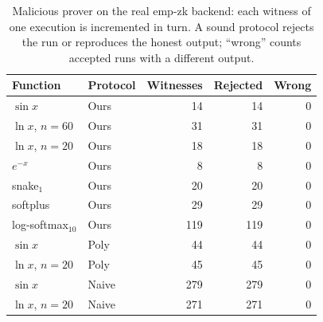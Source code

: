 \begin{table}[t]\centering\small
\caption{Malicious prover on the real emp-zk backend: each witness of one execution is incremented in turn. A sound protocol rejects the run or reproduces the honest output; ``wrong'' counts accepted runs with a different output.}
\label{tab:sound}
\setlength{\tabcolsep}{4pt}
\begin{tabular}{llrrr}\toprule
Function & Protocol & Witnesses & Rejected & Wrong\\\midrule
$\sin x$ & \textsf{Ours} & 14 & 14 & 0\\
$\ln x$, $n{=}60$ & \textsf{Ours} & 31 & 31 & 0\\
$\ln x$, $n{=}20$ & \textsf{Ours} & 18 & 18 & 0\\
$e^{-x}$ & \textsf{Ours} & 8 & 8 & 0\\
snake$_1$ & \textsf{Ours} & 20 & 20 & 0\\
softplus & \textsf{Ours} & 29 & 29 & 0\\
log-softmax$_{10}$ & \textsf{Ours} & 119 & 119 & 0\\
$\sin x$ & \textsf{Poly} & 44 & 44 & 0\\
$\ln x$, $n{=}20$ & \textsf{Poly} & 45 & 45 & 0\\
$\sin x$ & \textsf{Naive} & 279 & 279 & 0\\
$\ln x$, $n{=}20$ & \textsf{Naive} & 271 & 271 & 0\\
\bottomrule\end{tabular}
\end{table}
